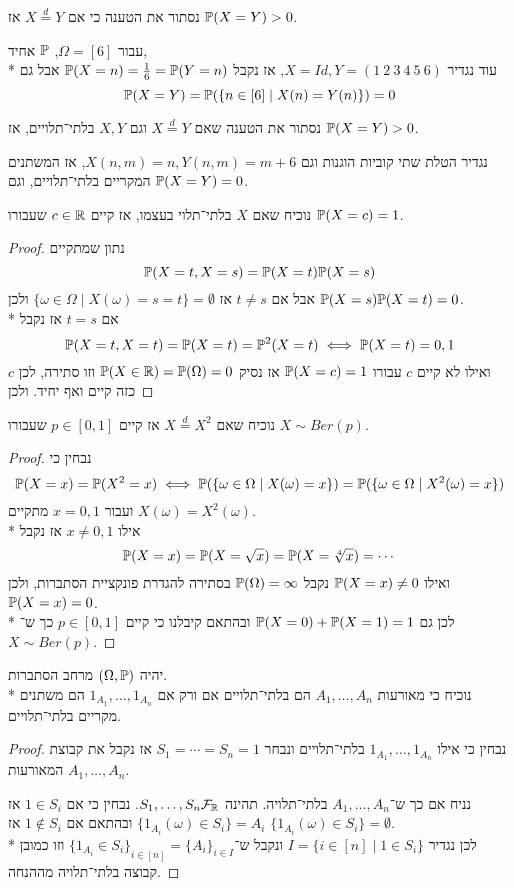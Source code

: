 \subquestion{}
נסתור את הטענה כי אם $X \overset{d}{=} Y$ אז $\mathbb{P}(X = Y) > 0$.
\begin{solution}
	עבור $\Omega = [6]$, $\mathbb{P}$ אחיד, \\*
	עוד נגדיר $X = Id, Y = (1\ 2\ 3\ 4\ 5\ 6)$, אז נקבל $\mathbb{P}(X = n) = \frac{1}{6} = \mathbb{P}(Y = n)$ אבל גם
	\[
		\mathbb{P}(X = Y)
		= \mathbb{P}(\{n \in [6] \mid X(n) = Y(n)\})
		= 0
	\]
\end{solution}

\subquestion{}
נסתור את הטענה שאם $X \overset{d}{=} Y$ וגם $X, Y$ בלתי־תלויים, אז $\mathbb{P}(X = Y) > 0$.
\begin{solution}
	נגדיר הטלת שתי קוביות הוגנות וגם $X(n, m) = n, Y(n, m) = m + 6$, אז המשתנים המקריים בלתי־תלויים, וגם $\mathbb{P}(X = Y) = 0$.
\end{solution}

\subquestion{}
נוכיח שאם $X$ בלתי־תלוי בעצמו, אז קיים $c \in \mathbb{R}$ שעבורו $\mathbb{P}(X = c) = 1$.
\begin{proof}
	נתון שמתקיים
	\[
		\mathbb{P}(X = t, X = s) = \mathbb{P}(X = t) \mathbb{P}(X = s)
	\]
	אבל אם $t \ne s$ אז $\{ \omega \in \Omega \mid X(\omega) = s = t \} = \emptyset$ ולכן $\mathbb{P}(X = s) \mathbb{P}(X = t) = 0$. \\*
	אם $t = s$ אז נקבל
	\[
		\mathbb{P}(X = t, X = t) = \mathbb{P}(X = t) = \mathbb{P}^2(X = t)
		\iff
		\mathbb{P}(X = t) = 0, 1
	\]
	ואילו לא קיים $c$ עבורו $\mathbb{P}(X = c) = 1$ אז נסיק $\mathbb{P}(X \in \mathbb{R}) = \mathbb{P}(\Omega) = 0$ וזו סתירה, לכן $c$ כזה קיים ואף יחיד.
	ולכן 
\end{proof}

\subquestion{}
נוכיח שאם $X \overset{d}{=} X^2$ אז קיים $p \in [0, 1]$ שעבורו $X \sim Ber(p)$.
\begin{proof}
	נבחין כי
	\[
		\mathbb{P}(X = x) = \mathbb{P}(X^2 = x)
		\iff
		\mathbb{P}(\{\omega \in \Omega \mid X(\omega) = x\}) = \mathbb{P}(\{\omega \in \Omega \mid X^2(\omega) = x\})
	\]
	ועבור $x = 0, 1$ מתקיים $X(\omega) = X^2(\omega)$. \\*
	אילו $x \ne 0, 1$ אז נקבל
	\[
		\mathbb{P}(X = x) = \mathbb{P}(X = \sqrt{x}) = \mathbb{P}(X = \sqrt[4]{x}) = \cdots
	\]
	ואילו $\mathbb{P}(X = x) \ne 0$ נקבל $\mathbb{P}(\Omega) = \infty$ בסתירה להגדרת פונקציית הסתברות, ולכן $\mathbb{P}(X = x) = 0$. \\*
	לכן גם $\mathbb{P}(X = 0) + \mathbb{P}(X = 1) = 1$ ובהתאם קיבלנו כי קיים $p \in [0, 1]$ כך ש־$X \sim Ber(p)$.
\end{proof}

\question{}
יהיה $(\Omega, \mathbb{P})$ מרחב הסתברות. \\*
נוכיח כי מאורעות $A_1, \dots, A_n$ הם בלתי־תלויים אם ורק אם $1_{A_1}, \dots, 1_{A_n}$ הם משתנים מקריים בלתי־תלויים.
\begin{proof}
	נבחין כי אילו $1_{A_1}, \dots, 1_{A_n}$ בלתי־תלויים ונבחר $S_1 = \cdots = S_n = 1$ אז נקבל את קבוצת המאורעות $A_1, \dots, A_n$.

	נניח אם כך ש־$A_1, \dots, A_n$ בלתי־תלויה.
	תהינה $S_1, \dots, S_n \mathcal{F}_{\mathbb{R}}$. נבחין כי אם $1 \in S_i$ אז $\{ 1_{A_i}(\omega) \in S_i \} = A_i$ ובהתאם אם $1 \notin S_i$ אז $\{ 1_{A_i}(\omega) \in S_i \} = \emptyset$. \\*
	לכן נגדיר $I = \{ i \in [n] \mid 1 \in S_i \}$ ונקבל ש־${\{1_{A_i} \in S_i\}}_{i \in [n]} = {\{ A_i \}}_{i \in I}$ וזו כמובן קבוצה בלתי־תלויה מההנחה.
\end{proof}


